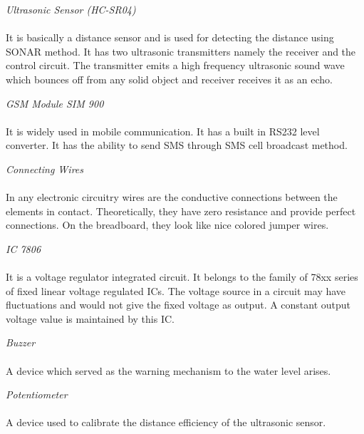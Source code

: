 \documentclass[11pt]{article}
\begin{document}
 \textit{\Large Ultrasonic Sensor (HC-SR04)}
\paragraph{} {\Large It is basically a distance sensor and is used for detecting the distance using SONAR method. It has two ultrasonic transmitters namely the receiver and the control circuit. The transmitter emits a high frequency ultrasonic sound wave which bounces off from any solid object and receiver receives it as an echo. 

\textit{\Large GSM Module SIM 900}
\paragraph{} {\Large It is widely used in mobile communication. It has a built in RS232 level converter. It has the ability to send SMS through SMS cell broadcast method.}

\textit {\Large Connecting Wires}
\paragraph{} {\Large In any electronic circuitry wires are the conductive connections between the elements in contact. Theoretically, they have zero resistance and provide perfect connections. On the breadboard, they look like nice colored jumper wires.}

\textit {\Large IC 7806}
\paragraph{} {\Large It is a voltage regulator integrated circuit. It belongs to the family of 78xx series of fixed linear voltage regulated ICs. The voltage source in a circuit may have fluctuations and would not give the fixed voltage as output. A constant output voltage value is maintained by this IC.}

\textit{\Large Buzzer}
\paragraph{} {\Large A device which served as the warning mechanism to the water level arises.}

 \textit {\Large Potentiometer}
\paragraph{} {\Large A device used to calibrate the distance efficiency of the ultrasonic sensor.}

}
\end{document}
